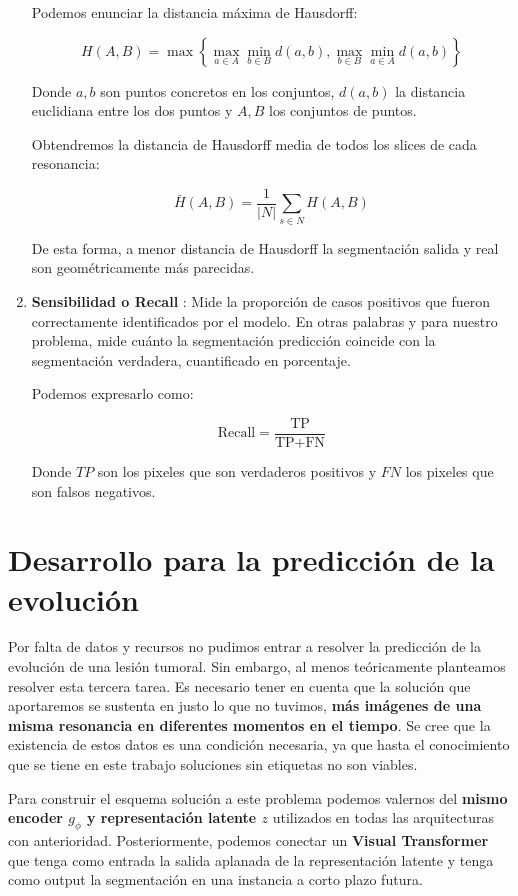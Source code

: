 \begin{enumerate}
	Podemos enunciar la distancia máxima de Hausdorff:
	
	$$ H(A, B) = \max \left\{ \max_{a \in A} \min_{b \in B} d(a, b), \max_{b \in B} \min_{a \in A} d(a, b) \right\} $$
	
	Donde $a, b$ son puntos concretos en los conjuntos, $d(a, b)$ la distancia euclidiana entre los dos puntos y $A, B$ los conjuntos de puntos.
	
	Obtendremos la distancia de Hausdorff media de todos los slices de cada resonancia:
	
	$$ \bar{H}(A, B) = \frac{1}{|N|} \sum_{s \in N} H(A, B) $$
	
	De esta forma, a menor distancia de Hausdorff la segmentación salida y real son geométricamente más parecidas.
	
	\item \textbf{Sensibilidad o Recall} : Mide la proporción de casos positivos que fueron correctamente identificados por el modelo. En otras palabras y para nuestro problema, mide cuánto la segmentación predicción coincide con la segmentación verdadera, cuantificado en porcentaje.
	
	Podemos expresarlo como:
	
	$$ \text{Recall} = \frac{\text{TP}}{\text{TP} + \text{FN}} $$
	
	Donde $TP$ son los pixeles que son verdaderos positivos y $FN$ los pixeles que son falsos negativos.
	
\end{enumerate}

\section{Desarrollo para la predicción de la evolución}

Por falta de datos y recursos no pudimos entrar a resolver la predicción de la evolución de una lesión tumoral. Sin embargo, al menos teóricamente planteamos resolver esta tercera tarea. Es necesario tener en cuenta que la solución que aportaremos se sustenta en justo lo que no tuvimos, \textbf{más imágenes de una misma resonancia en diferentes momentos en el tiempo}. Se cree que la existencia de estos datos es una condición necesaria, ya que hasta el conocimiento que se tiene en este trabajo soluciones sin etiquetas no son viables.

Para construir el esquema solución a este problema podemos valernos del \textbf{mismo encoder $g_{\phi}$ y representación latente $z$} utilizados en todas las arquitecturas con anterioridad. Posteriormente, podemos conectar un \textbf{Visual Transformer} que tenga como entrada la salida aplanada de la representación latente y tenga como output la segmentación en una instancia a corto plazo futura.

